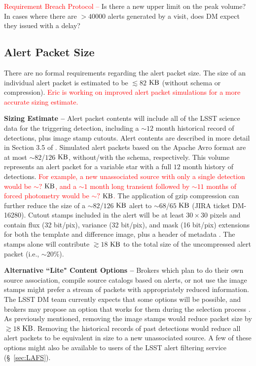 \documentclass[DM,authoryear,toc]{lsstdoc}
\begin{document}
\textcolor{red}{Requirement Breach Protocol --} Is there a new upper limit on the peak volume? In cases where there are $>40000$ alerts generated by a visit, does DM expect they issued with a delay?

\subsection{Alert Packet Size}\label{ssec:packet_size}

There are no formal requirements regarding the alert packet size. The size of an individual alert packet is estimated to be $\lesssim82$ $\rm KB$ (without schema or compression). \textcolor{red}{Eric is working on improved alert packet simulations for a more accurate sizing estimate.}

{\bf Sizing Estimate --} Alert packet contents will include all of the LSST science data for the triggering detection, including a $\sim12$ month historical record of detections, plus image stamp cutouts. Alert contents are described in more detail in Section 3.5 of . Simulated alert packets based on the Apache Avro format are at most $\sim82$/$126$ $\rm KB$, without/with the schema, respectively. This volume represents an alert packet for a variable star with a full $12$ month history of detections. \textcolor{red}{For example, a new unassociated source with only a single detection would be $\sim?$ $\rm KB$, and a $\sim1$ month long transient followed by $\sim11$ months of forced photometry would be $\sim?$ $\rm KB$.} The application of gzip compression can further reduce the size of a $\sim82$/$126$ $\rm KB$ alert to $\sim68$/$65$ $\rm KB$ (JIRA ticket DM-16280). Cutout stamps included in the alert will be at least $30\times30$ pixels and contain flux (32 bit/pix), variance (32 bit/pix), and mask (16 bit/pix) extensions for both the template and difference image, plus a header of metadata . The stamps alone will contribute $\gtrsim18$ $\rm KB$ to the total size of the uncompressed alert packet (i.e., $\sim20\%$).

{\bf Alternative ``Lite" Content Options --} Brokers which plan to do their own source association, compile source catalogs based on alerts, or not use the image stamps might prefer a stream of packets with appropriately reduced information. The LSST DM team currently expects that some options will be possible, and brokers may propose an option that works for them during the selection process . As previously mentioned, removing the image stamps would reduce packet size by $\gtrsim18$ $\rm KB$. Removing the historical records of past detections would reduce all alert packets to be equivalent in size to a new unassociated source. A few of these options might also be available to users of the LSST alert filtering service (\S~\ref{sec:LAFS}). 
\end{document}
